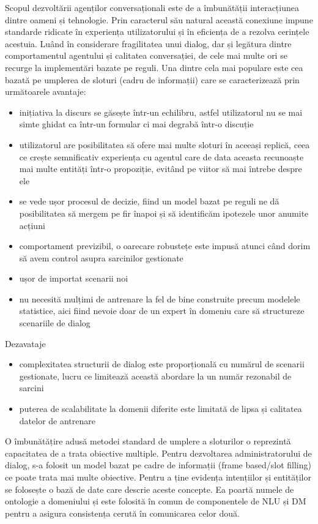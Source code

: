Scopul dezvoltării agenților conversaționali este de a îmbunătății interacțiunea dintre oameni și tehnologie. Prin caracterul său natural această conexiune impune standarde ridicate în experiența utilizatorului și în eficiența de a rezolva cerințele acestuia. Luând în considerare fragilitatea unui dialog, dar și legătura dintre comportamentul agentului și calitatea conversației, de cele mai multe ori se recurge la implementări bazate pe reguli. Una dintre cela mai populare este cea bazată pe umplerea de sloturi (cadru de informații) care se caracterizează prin următoarele avantaje:
\begin{itemize}
	\item inițiativa la discurs se găsește într-un echilibru, astfel utilizatorul nu se mai simte ghidat ca într-un formular ci mai degrabă într-o discuție
	\item utilizatorul are posibilitatea să ofere mai multe sloturi în aceeași replică, ceea ce crește semnificativ experiența cu agentul care de data aceasta recunoaște mai multe entități într-o propoziție, evitând pe viitor să mai întrebe despre ele
	\item se vede ușor procesul de decizie, fiind un model bazat pe reguli ne dă posibilitatea să mergem pe fir înapoi și să identificăm ipotezele unor anumite acțiuni
	\item comportament previzibil, o oarecare robustețe este impusă atunci când dorim să avem control asupra sarcinilor gestionate
	\item ușor de importat scenarii noi
	\item nu necesită mulțimi de antrenare la fel de bine construite precum modelele statistice, aici fiind nevoie doar de un expert în domeniu care să structureze scenariile de dialog
\end{itemize}

Dezavataje
\begin{itemize}
	\item complexitatea structurii de dialog este proporțională cu numărul de scenarii gestionate, lucru ce limitează această abordare la un număr rezonabil de sarcini
	\item puterea de scalabilitate la domenii diferite este limitată de lipsa și calitatea datelor de antrenare
\end{itemize}

O îmbunătățire adusă metodei standard de umplere a sloturilor o reprezintă capacitatea de a trata obiective multiple.
Pentru dezvoltarea administratorului de dialog, s-a folosit un model bazat pe cadre de informații (frame based/slot filling) ce poate trata mai multe obiective.
Pentru a ține evidența intențiilor și entităților se folosește o bază de date care descrie aceste concepte. Ea poartă numele de ontologie a domeniului și este folosită în comun de componentele de NLU și DM pentru a asigura consistența cerută în comunicarea celor două.

